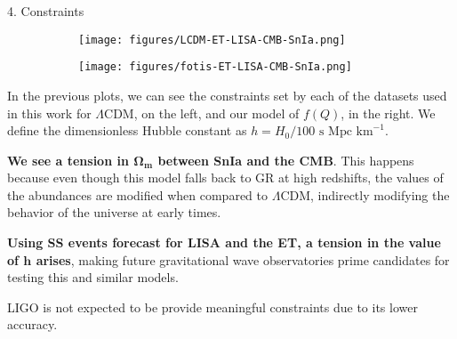 \begin{block}{4. Constraints}

\begin{figure}[h!]
    \centering
    \begin{subfigure}[b]{0.49\textwidth}
        \centering
        \texttt{[image: figures/LCDM-ET-LISA-CMB-SnIa.png]}
     \end{subfigure}
     \hfill
     \begin{subfigure}[b]{0.49\textwidth}
        \centering
        \texttt{[image: figures/fotis-ET-LISA-CMB-SnIa.png]}
     \end{subfigure}
\end{figure}

In the previous plots, we can see the constraints set by each of the datasets used in this work for $\Lambda$CDM, on the left, and our model of $f(Q)$, in the right. We define the dimensionless Hubble constant as $h = H_0/100 \,\, \text{s Mpc km}^{-1}$.

\textbf{We see a tension in $\boldsymbol{\Omega_m}$ between \gls{SnIa} and the \gls{CMB}}. This happens because even though this model falls back to \gls{GR} at high redshifts, the values of the abundances are modified when compared to $\Lambda$CDM, indirectly modifying the behavior of the universe at early times.

\textbf{Using \gls{SS} events forecast for \gls{LISA} and the \gls{ET}, a tension in the value of $\boldsymbol{h}$ arises}, making future gravitational wave observatories prime candidates for testing this and similar models.

\gls{LIGO} is not expected to be provide meaningful constraints due to its lower accuracy.

\end{block}